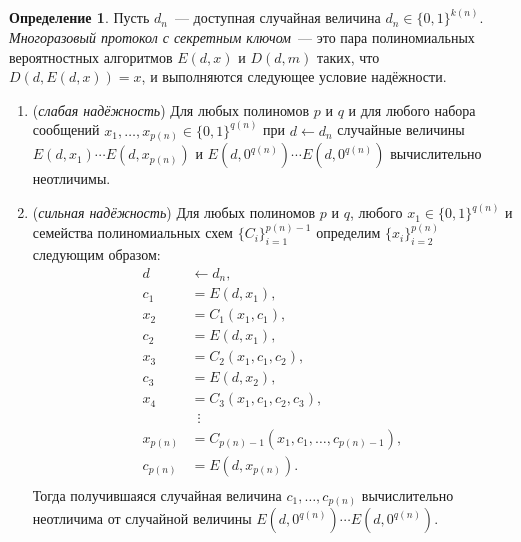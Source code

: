 \documentclass[12pt,a4paper]{article}
\newcommand{\bits}{\{0,1\}}
\theoremstyle{definition}
\newtheorem{definition}{Определение}[section]
\theoremstyle{plain}
\theoremstyle{remark}
\begin{document}
\begin{definition}
Пусть $d_n$~--- доступная случайная величина $d_n\in\bits^{k(n)}$.
\emph{Многоразовый протокол с секретным ключом}~--- это пара
полиномиальных вероятностных алгоритмов $E(d, x)$ и 
$D(d, m)$ таких, что $D(d, E(d, x)) = x$, и выполняются
следующее условие надёжности.
\begin{enumerate}[label=\alph*)]
\item (\emph{слабая надёжность}) Для любых полиномов $p$ и $q$ и для любого набора сообщений $x_1,\dotsc,x_{p(n)}\in\bits^{q(n)}$ при $d\gets d_n$
случайные величины $E(d,x_1)\dotsb E(d,x_{p(n)})$ и
$E(d,0^{q(n)})\dotsb E(d,0^{q(n)})$ вычислительно неотличимы.
\item (\emph{сильная надёжность})
 Для любых полиномов $p$ и $q$, любого $x_1\in\bits^{q(n)}$
 и семейства полиномиальных схем $\{C_i\}_{i=1}^{p(n) - 1}$
 определим $\{x_i\}_{i=2}^{p(n)}$ следующим образом:
 $$
 \begin{aligned}
 d&\gets d_n,\\
 c_1 &= E(d, x_1),\\
 x_2 &= C_1(x_1, c_1),\\
 c_2 &= E(d, x_1),\\
 x_3 &= C_2(x_1, c_1,c_2),\\
 c_3 &= E(d, x_2),\\
 x_4 &= C_3(x_1, c_1, c_2, c_3),\\
 &\ \;\vdots\\ 
 x_{p(n)} &= C_{p(n)-1}(x_1, c_1,\dotsc,c_{p(n) - 1}),\\
 c_{p(n)} &= E(d, x_{p(n)}).\\
 \end{aligned}
 $$
Тогда получившаяся случайная величина $c_1,\dotsc,c_{p(n)}$ вычислительно неотличима от случайной величины
$E(d,0^{q(n)})\dotsb E(d,0^{q(n)})$.
\end{enumerate}
\end{definition}
\end{document}
